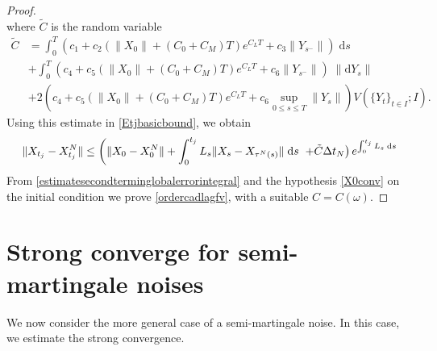 \documentclass[reqno,12pt]{amsart}
\theoremstyle{plain} %
\theoremstyle{definition} %
\begin{document}
\begin{proof}
\[    \]
    where $\tilde C$ is the random variable
    \begin{equation}
        \begin{aligned}
            \tilde C & = \int_0^T \left(c_1 + c_2 \left(\|X_0\| + (C_0 + C_M) T \right)e^{C_L T} + c_3\|Y_{s^-}\|\right)\;\mathrm{d}s \\
            & + \int_0^T \left(c_4 + c_5 \left(\|X_0\| + (C_0 + C_M) T \right)e^{C_L T} + c_6\|Y_{s^-}\|\right)\;\|\mathrm{d}Y_s\| \\
            & + 2\left(c_4 + c_5\left(\|X_0\| + (C_0 + C_M) T \right)e^{C_L T} + c_6\sup_{0\leq s \leq T}\|Y_s\|\right) V(\{Y_t\}_{t\in I}; I).
        \end{aligned}
    \end{equation}
    Using this estimate in \eqref{Etjbasicbound}, we obtain
    \[
        \|X_{t_j} - X_{t_j}^N\| \leq \left( \|X_0 - X_0^N\| + \int_0^{t_j} L_s\|X_s - X_{\tau^N(s)}\| \;\mathrm{d}s \right. \\
            \left. + \tilde C \Delta t_N\right) e^{\int_0^{t_j} L_s\;\mathrm{d}s}
    \]
    From \eqref{estimatesecondterminglobalerrorintegral} and the hypothesis \eqref{X0conv} on the initial condition we prove \eqref{ordercadlagfv}, with a suitable $C=C(\omega)$.
\end{proof}

\section{Strong converge for semi-martingale noises}
\label{secsubmartingale}

We now consider the more general case of a semi-martingale noise. In this case, we estimate the strong convergence.
\end{document}
